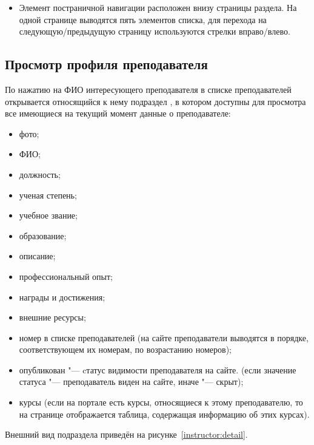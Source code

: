 \begin{itemize}
	\item Элемент постраничной навигации          
 расположен внизу страницы раздела. На одной странице выводятся пять элементов списка, для перехода на следующую/предыдущую страницу используются стрелки вправо/влево.
	
\end{itemize}


\subsection{Просмотр профиля преподавателя}\label{instructor:detail_section}
По нажатию на ФИО интересующего преподавателя в списке преподавателей открывается относящийся к нему подраздел , в котором доступны для просмотра все имеющиеся на текущий момент данные о преподавателе:
\begin{itemize}
	\item фото;
	\item ФИО;
	\item должность;
	\item ученая степень;
	\item учебное звание;
	\item образование;
	\item описание;
	\item профессиональный опыт;
	\item награды и достижения;
	\item внешние ресурсы;
	\item номер в списке преподавателей (на сайте преподаватели выводятся в порядке, соответствующем их номерам, по возрастанию номеров);
	\item опубликован "--- cтатус видимости преподавателя на сайте. (если значение статуса  "--- преподаватель виден на сайте, иначе "--- скрыт);
	\item курсы (если на портале есть курсы, относящиеся к этому преподавателю, то на странице отображается таблица, содержащая информацию об этих курсах).
\end{itemize}
Внешний вид подраздела приведён на рисунке~\ref{instructor:detail}.


